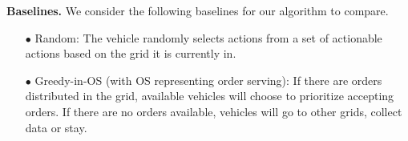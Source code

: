 


\noindent\textbf{Baselines.}
We consider the following baselines for our algorithm to compare.
\begin{itemize}
\item[$\bullet$] 
Random: The vehicle randomly selects actions from a set of actionable actions based on the grid it is currently in.
\end{itemize}

\begin{itemize}
\item[$\bullet$] 
Greedy-in-OS (with OS representing order serving): If there are orders distributed in the grid, available vehicles will choose to prioritize accepting orders. If there are no orders available, vehicles will go to other grids, collect data or stay.
\end{itemize}

